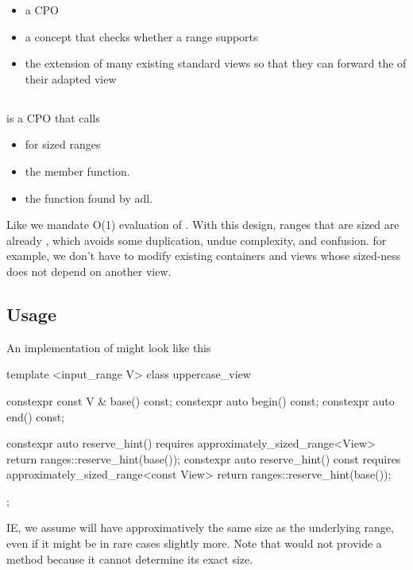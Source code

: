 \documentclass{wg21}
\begin{document}
\begin{itemize}
\item a  CPO
\item a  concept that checks whether a range supports 
\item the extension of many existing standard views so that they can forward the  of their adapted view
\end{itemize}

\subsection{}

 is a CPO that calls
\begin{itemize}
    \item {} for sized ranges
    \item the  member function.
    \item the  function found by adl.
\end{itemize}

Like  we mandate O(1) evaluation of .
With this design, ranges that are sized are already , which avoids some duplication, undue complexity, and confusion.
for example, we don't have to modify existing containers and views whose sized-ness does not depend on another view.

\subsection{Usage}

An implementation of  might look like this

\begin{colorblock}
template <input_range V>
class uppercase_view {
    constexpr const V & base() const;
    constexpr auto begin() const;
    constexpr auto end() const;

    constexpr auto reserve_hint() requires approximately_sized_range<View> {
        return ranges::reserve_hint(base());
    }
    constexpr auto reserve_hint() const requires approximately_sized_range<const View> {
        return ranges::reserve_hint(base());
    }
};
\end{colorblock}

IE, we assume  will have approximatively the same size as the underlying range, even if it might be in rare cases slightly more.
Note that  would not provide a  method because it cannot determine its exact size.
\end{document}
